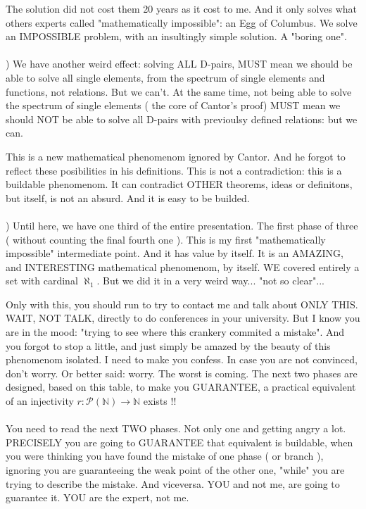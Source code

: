 	\noindent
	The solution did not cost them 20 years as it cost to me. And it only solves what others experts called "mathematically impossible": an Egg of Columbus. We solve an IMPOSSIBLE problem, with an insultingly simple solution. A "boring one".
	\\\\


	) We have another weird effect: solving ALL D-pairs, MUST mean we should be able to solve all single elements, from the spectrum of single elements and functions, not relations. But we can't. At the same time, not being able to solve the spectrum of single elements ( the core of Cantor's proof) MUST mean we should NOT be able to solve all D-pairs with previoulsy defined relations: but we can.
	
	\noindent
	This is a new mathematical phenomenom ignored by Cantor. And he forgot to reflect these posibilities in his definitions. This is not a contradiction: this is a buildable phenomenom. It can contradict OTHER theorems, ideas or definitons, but itself, is not an absurd. And it is easy to be builded.
	\\\\
	
	
	) Until here, we have one third of the entire presentation. The first phase of three ( without counting the final fourth one ). This is my first "mathematically impossible" intermediate point. And it has value by itself. It is an AMAZING, and INTERESTING mathematical phenomenom, by itself. WE covered entirely a set with cardinal $\aleph_{1}$. But we did it in a very weird way... "not so clear"... 
	
	\noindent
	Only with this, you should run to try to contact me and talk about ONLY THIS. WAIT, NOT TALK, directly to do conferences in your university. But I know you are in the mood: "trying to see where this crankery commited a mistake". And you forgot to stop a little, and just simply be amazed by the beauty of this phenomenom isolated. I need to make you confess. In case you are not convinced, don't worry. Or better said: worry. The worst is coming. The next two phases are designed, based on this table, to make you GUARANTEE, a practical equivalent of an injectivity $r:\mathcal{P}(\mathbb{N}) \longrightarrow \mathbb{N}$ exists !!
	\\\\
	
	\noindent
	You need to read the next TWO phases. Not only one and getting angry a lot. PRECISELY you are going to GUARANTEE that equivalent is buildable, when you were thinking you have found the mistake of one phase ( or branch ), ignoring you are guaranteeing the weak point of the other one, "while" you are trying to describe the mistake. And viceversa. YOU and not me, are going to guarantee it. YOU are the expert, not me.
	\\\\
	
